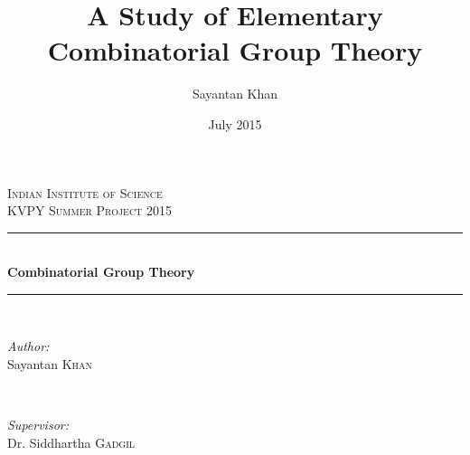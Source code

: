 \documentclass[12pt, titlepage]{article}
\title{A Study of Elementary Combinatorial Group Theory}
\author{Sayantan Khan}
\date{July 2015}
\theoremstyle{definition}
\begin{document}
\begin{titlepage}

\newcommand{\HRule}{\rule{\linewidth}{0.5mm}} %

\center %
 

\textsc{\LARGE Indian Institute of Science}\\[1.5cm] %
\textsc{\Large KVPY Summer Project 2015}\\[0.5cm] %


\HRule \\[0.4cm]
{ \huge \bfseries Combinatorial Group Theory}\\[0.4cm] %
\HRule \\[1.5cm]
 

\begin{minipage}{0.4\textwidth}
\begin{flushleft} \large
\emph{Author:}\\
Sayantan \textsc{Khan} %
\end{flushleft}
\end{minipage}
~
\begin{minipage}{0.4\textwidth}
\begin{flushright} \large
\emph{Supervisor:} \\
Dr. Siddhartha \textsc{Gadgil} %
\end{flushright}
\end{minipage}\\[2cm]



\end{titlepage}
\end{document}
